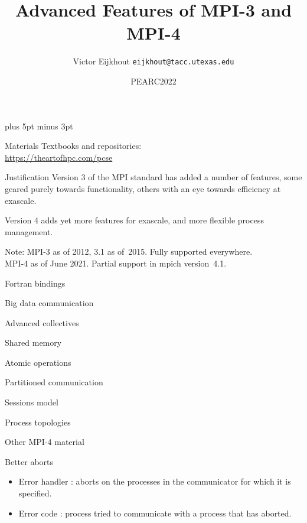 \documentclass[11pt,headernav]{beamer}
\newcounter{tacc}
\def\Location{}%
\def\courseyear{2022}
\def\Location{TACC APP institute MPI training \courseyear}
\def\Location{TACC MPI training \courseyear}
\def\Location{PEARC2022}
\begin{document}
\parskip=10pt plus 5pt minus 3pt

\title{Advanced Features of MPI-3 and MPI-4}
\author{Victor Eijkhout {\tt eijkhout@tacc.utexas.edu}}
\date{\Location}

\begin{frame}
  \titlepage
\end{frame}

\begin{download}
  \begin{frame}[containsverbatim]{Materials}
    Textbooks and repositories:\\
    \url{https://theartofhpc.com/pcse}
  \end{frame}
\end{download}

\begin{frame}{Justification}
  Version 3 of the MPI standard has added a number
  of features, some geared purely towards functionality,
  others with an eye towards efficiency at exascale.

  Version 4 adds yet more features for exascale,
  and more flexible process management.

  Note: MPI-3 as of 2012, 3.1 as of~2015. Fully supported everywhere.\\
  MPI-4 as of June 2021. Partial support in mpich version~4.1.
\end{frame}

 {Fortran bindings}


 {Big data communication}


 {Advanced collectives}


 {Shared memory}


 {Atomic operations}

 
 {Partitioned communication}


 {Sessions model}


 {Process topologies}


 {Other MPI-4 material}

\begin{numberedframe}{Better aborts}
  \begin{itemize}
  \item Error handler
     :
     aborts on the processes in the communicator for which it is specified.
  \item
    Error code :
    process tried to communicate
    with a process that has aborted.
  \end{itemize}

\end{numberedframe}
\end{document}
